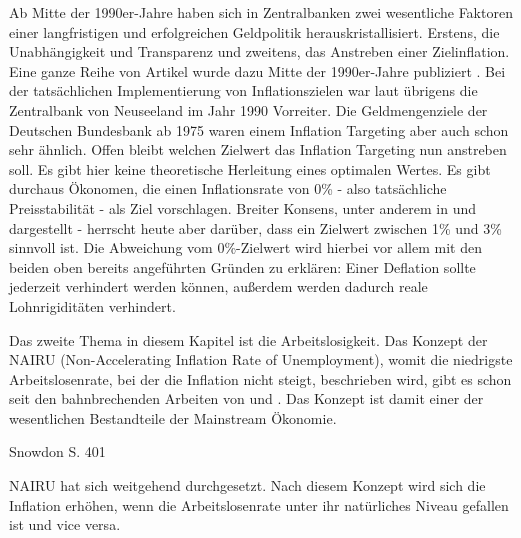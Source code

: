 Ab Mitte der 1990er-Jahre haben sich in Zentralbanken zwei wesentliche Faktoren einer langfristigen und erfolgreichen Geldpolitik herauskristallisiert. Erstens, die Unabhängigkeit und Transparenz und zweitens, das Anstreben einer Zielinflation. Eine ganze Reihe von Artikel wurde dazu Mitte der 1990er-Jahre publiziert \parencite{Alesina1993, Mishkin2000, Svensson2000, Bernanke1997}. Bei der tatsächlichen Implementierung von Inflationszielen war laut \textcite{Bernanke1999} übrigens die Zentralbank von Neuseeland im Jahr 1990 Vorreiter. Die Geldmengenziele der Deutschen Bundesbank ab 1975 waren einem Inflation Targeting aber auch schon sehr ähnlich. Offen bleibt welchen Zielwert das Inflation Targeting nun anstreben soll. Es gibt hier keine theoretische Herleitung eines optimalen Wertes. Es gibt durchaus Ökonomen, die einen Inflationsrate von 0\% - also tatsächliche Preisstabilität - als Ziel vorschlagen. Breiter Konsens, unter anderem in \textcite{Bernanke1999b} und \textcite{Akerlof1996} dargestellt - herrscht heute aber darüber, dass ein Zielwert zwischen 1\% und 3\% sinnvoll ist. Die Abweichung vom 0\%-Zielwert wird hierbei vor allem mit den beiden oben bereits angeführten Gründen zu erklären: Einer Deflation sollte jederzeit verhindert werden können, außerdem werden dadurch reale Lohnrigiditäten verhindert.



Das zweite Thema in diesem Kapitel ist die Arbeitslosigkeit. Das Konzept der NAIRU (Non-Accelerating Inflation Rate of Unemployment), womit die niedrigste Arbeitslosenrate, bei der die Inflation nicht steigt, beschrieben wird, gibt es schon seit den bahnbrechenden Arbeiten von \textcite{Friedman1968} und \textcite{Phelps1967}. Das Konzept ist damit einer der wesentlichen Bestandteile der Mainstream Ökonomie.

Snowdon S. 401

\textcite{Akerlof1996}


NAIRU hat sich weitgehend durchgesetzt. Nach diesem Konzept wird sich die Inflation erhöhen, wenn die Arbeitslosenrate unter ihr natürliches Niveau gefallen ist und vice versa.








